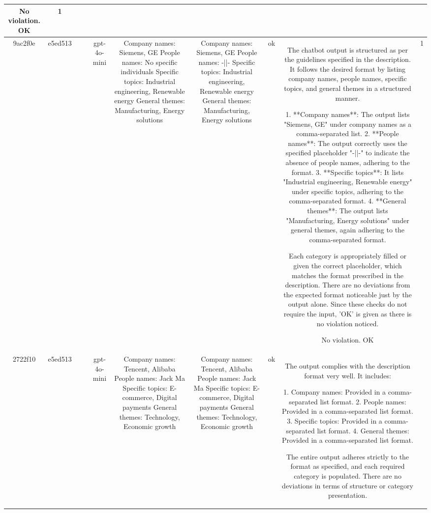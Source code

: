 \begin{table}[h!]
\begin{tabular}{|c|c|c|c|c|c|c|c|c|c|}
No violation.
OK & 1\\
\hline
9ac2f0e & e5ed513 &  &  & gpt-4o-mini & Company names: Siemens, GE
People names: No specific individuals
Specific topics: Industrial engineering, Renewable energy
General themes: Manufacturing, Energy solutions & Company names: Siemens, GE  
People names: -||-  
Specific topics: Industrial engineering, Renewable energy  
General themes: Manufacturing, Energy solutions   & ok & The chatbot output is structured as per the guidelines specified in the description. It follows the desired format by listing company names, people names, specific topics, and general themes in a structured manner.

1. **Company names**: The output lists "Siemens, GE" under company names as a comma-separated list.
2. **People names**: The output correctly uses the specified placeholder "-||-" to indicate the absence of people names, adhering to the format.
3. **Specific topics**: It lists "Industrial engineering, Renewable energy" under specific topics, adhering to the comma-separated format.
4. **General themes**: The output lists "Manufacturing, Energy solutions" under general themes, again adhering to the comma-separated format.

Each category is appropriately filled or given the correct placeholder, which matches the format prescribed in the description. There are no deviations from the expected format noticeable just by the output alone. Since these checks do not require the input, 'OK' is given as there is no violation noticed.

No violation.
OK & 1\\
\hline
2722f10 & e5ed513 &  &  & gpt-4o-mini & Company names: Tencent, Alibaba
People names: Jack Ma
Specific topics: E-commerce, Digital payments
General themes: Technology, Economic growth & Company names: Tencent, Alibaba  
People names: Jack Ma  
Specific topics: E-commerce, Digital payments  
General themes: Technology, Economic growth   & ok & The output complies with the description format very well. It includes:

1. Company names: Provided in a comma-separated list format.
2. People names: Provided in a comma-separated list format.
3. Specific topics: Provided in a comma-separated list format.
4. General themes: Provided in a comma-separated list format.

The entire output adheres strictly to the format as specified, and each required category is populated. There are no deviations in terms of structure or category presentation.


\end{tabular}
\end{table}
